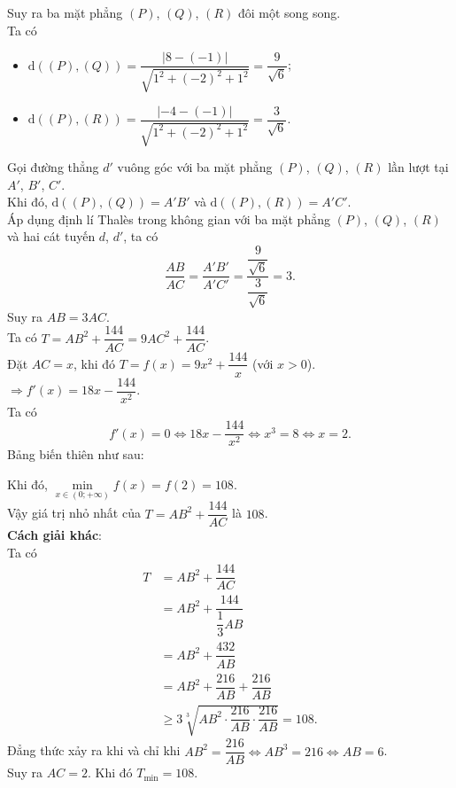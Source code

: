 \begin{bt}
{		Suy ra ba mặt phẳng $(P)$, $(Q)$,  $(R)$ đôi một song song.\\
		Ta  có
		\begin{itemize}
			\item  $\mathrm{d}\left((P),(Q)\right)=\dfrac{\left|8-(-1)\right|}{\sqrt{1^2+(-2)^2+1^2}}=\dfrac{9}{\sqrt{6}}$;
			\item $\mathrm{d}\left((P),(R)\right)=\dfrac{\left|-4-(-1)\right|}{\sqrt{1^2+(-2)^2+1^2}}=\dfrac{3}{\sqrt{6}}$. 
		\end{itemize}
		Gọi đường thẳng $d'$ vuông góc với ba mặt phẳng $(P)$,  $(Q)$, $(R)$ lần lượt tại $A'$, $B'$, $C'$.\\
		Khi đó,  $\mathrm{d}\left((P),(Q)\right)=A'B'$ và $\mathrm{d}\left((P),(R)\right)=A'C'$.\\
		Áp dụng định lí Thalès trong không gian với ba mặt phẳng $(P)$,  $(Q)$, $(R)$ và hai cát tuyến $d$, $d'$, ta có
		 \[\dfrac{AB}{AC}=\dfrac{A'B'}{A'C'}=\dfrac{\dfrac{9}{\sqrt{6}}}{\dfrac{3}{\sqrt{6}}}=3.\]
		Suy ra  $AB=3AC$.\\
		 Ta có $T=AB^2+\dfrac{144}{AC}=9AC^2+\dfrac{144}{AC}$.\\
		Đặt $AC=x$, khi đó $T=f(x)=9x^2+\dfrac{144}{x}$ (với  $x>0$).\\
		$\Rightarrow f'(x)=18x-\dfrac{144}{x^2}$.\\ 
		Ta  có
		\[f'(x)=0\Leftrightarrow 18x-\dfrac{144}{x^2} \Leftrightarrow x^3=8  \Leftrightarrow x=2.\]
		Bảng  biến thiên như sau:
		\begin{center}
		\end{center}
		Khi đó, $\min \limits_{x\in(0;+\infty)}  f(x)=f(2)=108$.\\
		Vậy giá trị nhỏ nhất của $T=AB^2+\dfrac{144}{AC}$ là  $108$.\\
		 \noindent
		\textbf{Cách giải khác}:\\ 
		 Ta có
		\allowdisplaybreaks 
		\begin{align*}
			T&=AB^2+\dfrac{144}{AC}\\ 
			&=AB^2+\dfrac{144}{\dfrac{1}{3} AB}\\ 
			&=AB^2+\dfrac{432}{AB}\\ 
			 &=AB^2+\dfrac{216}{AB}+\dfrac{216}{AB}\\
			 &\geq 3\sqrt[3]{AB^2\cdot\dfrac{216}{AB}\cdot\dfrac{216}{AB}}=108.
		\end{align*}
		Đẳng thức  xảy ra khi và chỉ khi $AB^2=\dfrac{216}{AB} \Leftrightarrow AB^3=216\Leftrightarrow AB=6$.\\
		Suy ra  $AC=2$. Khi đó $T_{\min}=108$.
	 }
\end{bt}

